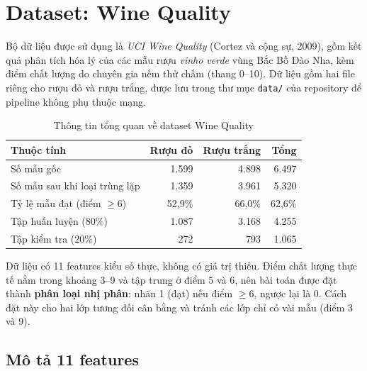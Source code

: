 \documentclass[12pt,a4paper]{report}
\begin{document}
\section{Dataset: Wine Quality}

Bộ dữ liệu được sử dụng là \textit{UCI Wine Quality} (Cortez và cộng sự, 2009), gồm kết quả phân tích hóa lý của các mẫu rượu \textit{vinho verde} vùng Bắc Bồ Đào Nha, kèm điểm chất lượng do chuyên gia nếm thử chấm (thang 0--10). Dữ liệu gồm hai file riêng cho rượu đỏ và rượu trắng, được lưu trong thư mục \texttt{data/} của repository để pipeline không phụ thuộc mạng.

\begin{table}[H]
  \centering
  \caption{Thông tin tổng quan về dataset Wine Quality}
  \label{tab:dataset}
  \begin{tabular}{lrrr}
    \toprule
    \textbf{Thuộc tính} & \textbf{Rượu đỏ} & \textbf{Rượu trắng} & \textbf{Tổng} \\
    \midrule
    Số mẫu gốc                         & 1.599   & 4.898   & 6.497 \\
    Số mẫu sau khi loại trùng lặp      & 1.359   & 3.961   & 5.320 \\
    Tỷ lệ mẫu đạt (điểm $\geq 6$)      & 52,9\%  & 66,0\%  & 62,6\% \\
    Tập huấn luyện (80\%)              & 1.087   & 3.168   & 4.255 \\
    Tập kiểm tra (20\%)                & 272     & 793     & 1.065 \\
    \bottomrule
  \end{tabular}
\end{table}

Dữ liệu có 11 features kiểu số thực, không có giá trị thiếu. Điểm chất lượng thực tế nằm trong khoảng 3--9 và tập trung ở điểm 5 và 6, nên bài toán được đặt thành \textbf{phân loại nhị phân}: nhãn 1 (đạt) nếu điểm $\geq 6$, ngược lại là 0. Cách đặt này cho hai lớp tương đối cân bằng và tránh các lớp chỉ có vài mẫu (điểm 3 và 9).

\subsection{Mô tả 11 features}
\end{document}
